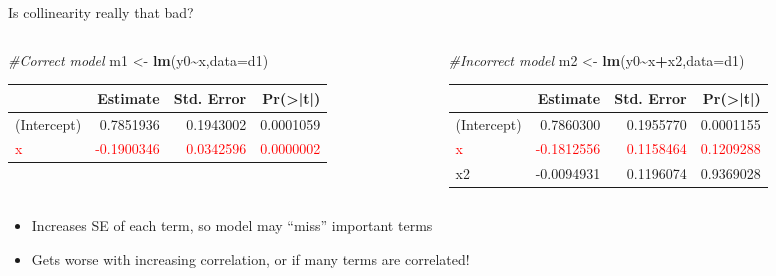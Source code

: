 \documentclass[
  ignorenonframetext,
  aspectratio=169]{beamer}
\newenvironment{Shaded}{\begin{snugshade}}{\end{snugshade}}
\newcommand{\AttributeTok}[1]{\textcolor[rgb]{0.13,0.29,0.53}{#1}}
\newcommand{\CommentTok}[1]{\textcolor[rgb]{0.56,0.35,0.01}{\textit{#1}}}
\newcommand{\FunctionTok}[1]{\textcolor[rgb]{0.13,0.29,0.53}{\textbf{#1}}}
\newcommand{\NormalTok}[1]{#1}
\newcommand{\OtherTok}[1]{\textcolor[rgb]{0.56,0.35,0.01}{#1}}
\newcommand{\SpecialCharTok}[1]{\textcolor[rgb]{0.81,0.36,0.00}{\textbf{#1}}}
\providecommand{\tightlist}{%
  \setlength{\itemsep}{0pt}\setlength{\parskip}{0pt}}
\let\oldShaded\Shaded %
\let\endoldShaded\endShaded
\renewenvironment{Shaded}{\scriptsize\oldShaded}{\endoldShaded}
\begin{document}
\begin{frame}[fragile]{Is collinearity really that bad?}
\protect\hypertarget{is-collinearity-really-that-bad}{}
\begin{columns}[T]
\begin{column}{0.48\textwidth}
\small

\begin{Shaded}
\begin{Highlighting}[]
\CommentTok{\#Correct model}
\NormalTok{m1 }\OtherTok{\textless{}{-}} \FunctionTok{lm}\NormalTok{(y0}\SpecialCharTok{\textasciitilde{}}\NormalTok{x,}\AttributeTok{data=}\NormalTok{d1)}
\end{Highlighting}
\end{Shaded}

\tiny

\begin{tabular}{l|r|r|r}
\hline
  & Estimate & Std. Error & Pr(>|t|)\\
\hline
(Intercept) & 0.7851936 & 0.1943002 & 0.0001059\\
\hline
\textcolor{red}{x} & \textcolor{red}{-0.1900346} & \textcolor{red}{0.0342596} & \textcolor{red}{0.0000002}\\
\hline
\end{tabular}
\end{column}

\begin{column}{0.48\textwidth}
\small

\begin{Shaded}
\begin{Highlighting}[]
\CommentTok{\#Incorrect model}
\NormalTok{m2 }\OtherTok{\textless{}{-}} \FunctionTok{lm}\NormalTok{(y0}\SpecialCharTok{\textasciitilde{}}\NormalTok{x}\SpecialCharTok{+}\NormalTok{x2,}\AttributeTok{data=}\NormalTok{d1)}
\end{Highlighting}
\end{Shaded}

\tiny

\begin{tabular}{l|r|r|r}
\hline
  & Estimate & Std. Error & Pr(>|t|)\\
\hline
(Intercept) & 0.7860300 & 0.1955770 & 0.0001155\\
\hline
\textcolor{red}{x} & \textcolor{red}{-0.1812556} & \textcolor{red}{0.1158464} & \textcolor{red}{0.1209288}\\
\hline
x2 & -0.0094931 & 0.1196074 & 0.9369028\\
\hline
\end{tabular}
\end{column}
\end{columns}

\begin{itemize}[<+->]
\tightlist
\item
  Increases SE of each term, so model may ``miss'' important terms
\item
  Gets worse with increasing correlation, or if many terms are
  correlated!
\end{itemize}
\end{frame}
\end{document}

